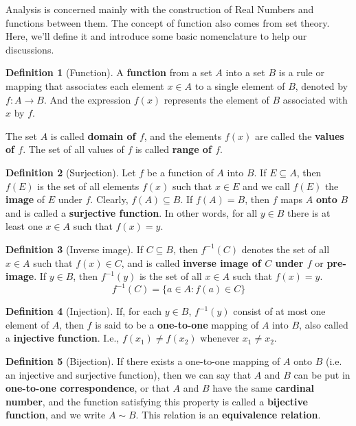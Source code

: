\documentclass[tikz,12pt,a4paper]{article}
\theoremstyle{definition}
\newtheorem{definition}{Definition}[section]
\begin{document}
Analysis is concerned mainly with the construction of Real Numbers and functions between them. The concept of function also comes from set theory. Here, we'll define it and introduce some basic nomenclature to help our discussions.

\begin{definition}[Function]
	A \textbf{function} from a set $A$ into a set $B$ is a rule or mapping that associates each element $x \in A$ to a single element of $B$, denoted by $f : A \longrightarrow B$. And the expression $f(x)$ represents the element of $B$ associated with $x$ by $f$.
	
	The set $A$ is called \textbf{domain of $f$}, and the elements $f(x)$ are called the \textbf{values of $f$}. The set of all values of $f$ is called \textbf{range of $f$}.
\end{definition}

\begin{definition}[Surjection]
	Let $f$ be a function of $A$ into $B$. If $E \subseteq A$, then $f(E)$ is the set of all elements $f(x)$ such that $x \in E$ and we call $f(E)$ the \textbf{image} of $E$ under $f$. Clearly, $f(A) \subseteq B$. If $f(A) = B$, then $f$ maps $A$ \textbf{onto} $B$ and is called a \textbf{surjective function}. In other words, for all $y \in B$ there is at least one $x \in A$ such that $f(x) = y$.
\end{definition}

\begin{definition}[Inverse image]
	If $C \subseteq B$, then $f^{-1}(C)$ denotes the set of all $x \in A$ such that $f(x) \in C$, and is called \textbf{inverse image of $C$ under $f$} or \textbf{pre-image}.
	If $y \in B$, then $f^{-1}(y)$ is the set of all $x \in A$ such that $f(x) = y$.
	\[ f^{-1}(C) = \{ a \in A : f(a) \in C \} \]
\end{definition}

\begin{definition}[Injection]
	If, for each $y \in B$, $f^{-1}(y)$ consist of at most one element of $A$, then $f$ is said to be a \textbf{one-to-one} mapping of $A$ into $B$, also called a \textbf{injective function}. I.e., $f(x_1) \neq f(x_2)$ whenever $x_1 \neq x_2$.
\end{definition}

\begin{definition}[Bijection]
	If there exists a one-to-one mapping of $A$ onto $B$ (i.e. an injective and surjective function), then we can say that $A$ and $B$ can be put in \textbf{one-to-one correspondence}, or that $A$ and $B$ have the same \textbf{cardinal number}, and the function satisfying this property is called a \textbf{bijective function}, and we write $A \sim B$. This relation is an \textbf{equivalence relation}.
\end{definition}
\end{document}

